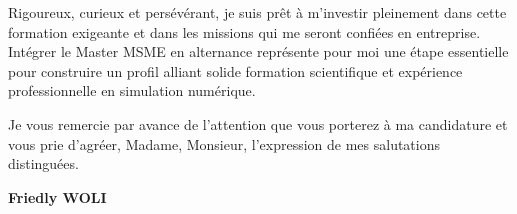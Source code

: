 \documentclass[11pt,a4paper]{article}
\begin{document}
Rigoureux, curieux et persévérant, je suis prêt à m’investir pleinement dans cette formation exigeante et dans les missions qui me seront confiées en entreprise. Intégrer le Master MSME en alternance représente pour moi une étape essentielle pour construire un profil alliant solide formation scientifique et expérience professionnelle en simulation numérique. 

Je vous remercie par avance de l’attention que vous porterez à ma candidature et vous prie d’agréer, Madame, Monsieur, l’expression de mes salutations distinguées.



	

	
	
	
	\vspace{0.8cm}
	
	
	
	
	
	
	\begin{flushright}
		
		\textbf{Friedly WOLI}
	\end{flushright}
	
	
\end{document}
